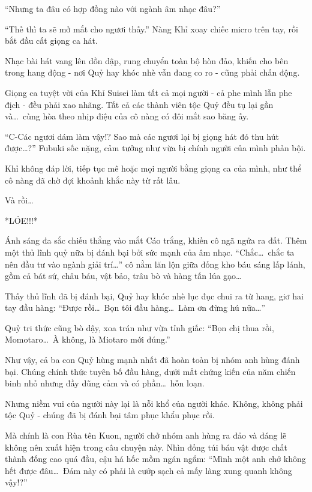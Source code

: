\documentclass[../main.tex]{subfiles}
\begin{document}
``Nhưng ta đâu có hợp đồng nào với ngành âm nhạc đâu?''

``Thế thì ta sẽ mở mắt cho ngươi thấy.'' Nàng Khỉ xoay chiếc micro trên tay, rồi bắt đầu cất giọng ca hát.

Nhạc bài hát vang lên dồn dập, rung chuyển toàn bộ hòn đảo, khiến cho bên trong hang động - nơi Quỷ hay khóc nhè vẫn đang co ro - cũng phải chấn động.

Giọng ca tuyệt vời của Khỉ Suisei làm tất cả mọi người - cả phe mình lẫn phe địch - đều phải xao nhãng. Tất cả các thành viên tộc Quỷ đều tụ lại gần và\dots\ cùng hòa theo nhịp điệu của cô nàng có đôi mắt sao băng ấy.

``C-Các ngươi dám làm vậy!? Sao mà các ngươi lại bị giọng hát đó thu hút được\dots?'' Fubuki sốc nặng, cảm tưởng như vừa bị chính người của mình phản bội.

Khỉ không đáp lời, tiếp tục mê hoặc mọi người bằng giọng ca của mình, như thể cô nàng đã chờ đợi khoảnh khắc này từ rất lâu.

Và rồi\dots

*LÓE!!!*

Ánh sáng đa sắc chiếu thẳng vào mắt Cáo trắng, khiến cô ngã ngửa ra đất. Thêm một thủ lĩnh quỷ nữa bị đánh bại bởi sức mạnh của âm nhạc. ``Chắc\dots\ chắc ta nên đầu tư vào ngành giải trí\dots'' cô nằm lăn lộn giữa đống kho báu sáng lấp lánh, gồm cả bát sứ, châu báu, vật bảo, trâu bò và hàng tấn lúa gạo\dots

Thấy thủ lĩnh đã bị đánh bại, Quỷ hay khóc nhè lục đục chui ra từ hang, giơ hai tay đầu hàng: ``Được rồi\dots\ Bọn tôi đầu hàng\dots\ Làm ơn đừng hú nữa\dots''

Quỷ tri thức cũng bò dậy, xoa trán như vừa tỉnh giấc: ``Bọn chị thua rồi, Momotaro\dots\ À không, là Miotaro mới đúng.''

Như vậy, cả ba con Quỷ hùng mạnh nhất đã hoàn toàn bị nhóm anh hùng đánh bại. Chúng chính thức tuyên bố đầu hàng, dưới mắt chứng kiến của năm chiến binh nhỏ nhưng đầy dũng cảm và có phần\dots\ hỗn loạn.

\ct

Nhưng niềm vui của người này lại là nỗi khổ của người khác. Không, không phải tộc Quỷ - chúng đã bị đánh bại tâm phục khẩu phục rồi.

Mà chính là con Rùa tên Kuon, người chở nhóm anh hùng ra đảo và đáng lẽ không nên xuất hiện trong câu chuyện này. Nhìn đống túi báu vật được chất thành đống cao quá đầu, cậu há hốc mồm ngán ngẩm: ``Mình một anh chở không hết được đâu\dots\ Đám này có phải là cướp sạch cả mấy làng xung quanh không vậy!?''
\end{document}
